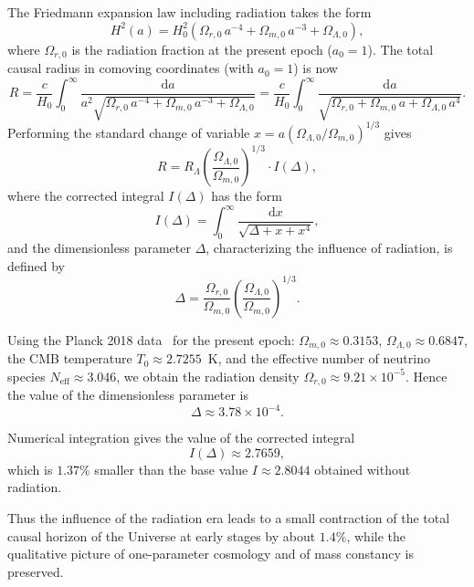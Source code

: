 \documentclass[10pt,a4paper]{article}
\begin{document}
The Friedmann expansion law including radiation takes the form
\begin{equation}
H^2(a) = H_0^2 \left( \Omega_{r,0}\,a^{-4} + \Omega_{m,0}\,a^{-3} + \Omega_{\Lambda,0} \right),
\end{equation}
where $\Omega_{r,0}$ is the radiation fraction at the present epoch ($a_0=1$). The total causal radius in comoving coordinates (with $a_0 = 1$) is now
\begin{equation}
R = \frac{c}{H_0} \int_0^{\infty} \frac{\mathrm{d}a}{a^2 \sqrt{\Omega_{r,0}\,a^{-4} + \Omega_{m,0}\,a^{-3} + \Omega_{\Lambda,0}}} = \frac{c}{H_0} \int_0^{\infty} \frac{\mathrm{d}a}{\sqrt{\Omega_{r,0} + \Omega_{m,0}\,a + \Omega_{\Lambda,0}\,a^4}}.
\end{equation}
Performing the standard change of variable $x = a \left(\Omega_{\Lambda,0}/\Omega_{m,0}\right)^{1/3}$ gives
\begin{equation}
R = R_\Lambda \left(\frac{\Omega_{\Lambda,0}}{\Omega_{m,0}}\right)^{1/3} \cdot I(\Delta),
\end{equation}
where the corrected integral $I(\Delta)$ has the form
\begin{equation}
I(\Delta) = \int_0^{\infty} \frac{\mathrm{d}x}{\sqrt{\Delta + x + x^4}},
\end{equation}
and the dimensionless parameter $\Delta$, characterizing the influence of radiation, is defined by
\begin{equation}
\Delta = \frac{\Omega_{r,0}}{\Omega_{m,0}} \left(\frac{\Omega_{\Lambda,0}}{\Omega_{m,0}}\right)^{1/3}.
\end{equation}

Using the Planck 2018 data~\cite{Planck2018} for the present epoch: $\Omega_{m,0} \approx 0.3153$, $\Omega_{\Lambda,0} \approx 0.6847$, the CMB temperature $T_0 \approx 2.7255$~K, and the effective number of neutrino species $N_{\mathrm{eff}} \approx 3.046$, we obtain the radiation density $\Omega_{r,0} \approx 9.21 \times 10^{-5}$. Hence the value of the dimensionless parameter is
\begin{equation}
\Delta \approx 3.78 \times 10^{-4}.
\end{equation}

Numerical integration gives the value of the corrected integral
\begin{equation}
I(\Delta) \approx 2.7659,
\end{equation}
which is $1.37\%$ smaller than the base value $I \approx 2.8044$ obtained without radiation.

Thus the influence of the radiation era leads to a small contraction of the total causal horizon of the Universe at early stages by about $1.4\%$, while the qualitative picture of one-parameter cosmology and of mass constancy is preserved.
\end{document}
